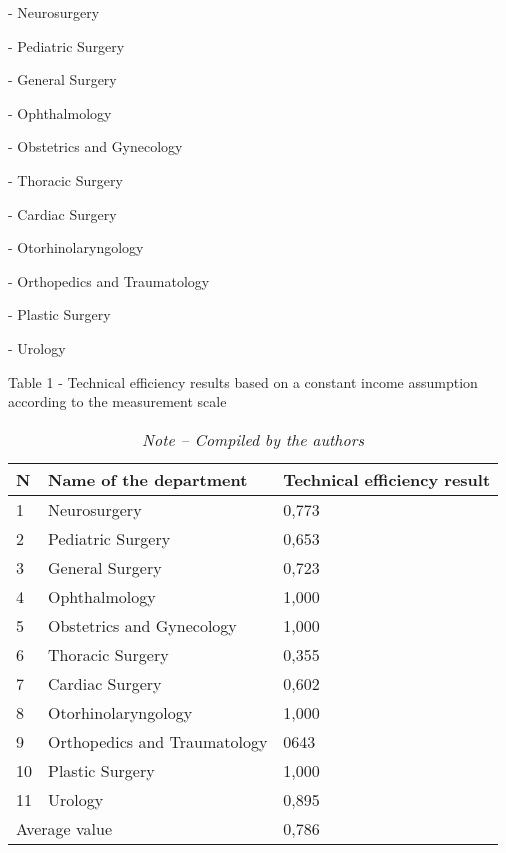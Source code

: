 \begin{multicols}{2}
- Neurosurgery

- Pediatric Surgery

- General Surgery

- Ophthalmology

- Obstetrics and Gynecology

- Thoracic Surgery

- Cardiac Surgery

- Otorhinolaryngology

- Orthopedics and Traumatology

- Plastic Surgery

- Urology
\end{multicols}

\begin{table}[H]
\caption*{Table 1 - Technical efficiency results based on a constant income assumption according to the measurement scale}
\centering
\begin{tabular}{|l|l|l|} 
\hline
N  & Name of the department           & Technical efficiency result  \\ 
\hline
1  & Neurosurgery                     & 0,773                        \\ 
\hline
2  & Pediatric Surgery                & 0,653                        \\ 
\hline
3  & General Surgery                  & 0,723                        \\ 
\hline
4  & Ophthalmology                    & 1,000                        \\ 
\hline
5  & Obstetrics and Gynecology        & 1,000                        \\ 
\hline
6  & Thoracic Surgery                 & 0,355                        \\ 
\hline
7  & Cardiac Surgery                  & 0,602                        \\ 
\hline
8  & Otorhinolaryngology              & 1,000                        \\ 
\hline
9  & Orthopedics and Traumatology     & 0643                         \\ 
\hline
10 & Plastic Surgery                  & 1,000                        \\ 
\hline
11 & Urology                          & 0,895                        \\ 
\hline
\multicolumn{2}{|l|}{Average value}   & 0,786                        \\
\hline
\end{tabular}
\caption*{\normalfont\emph{Note -- Compiled by the authors}}
\end{table}

